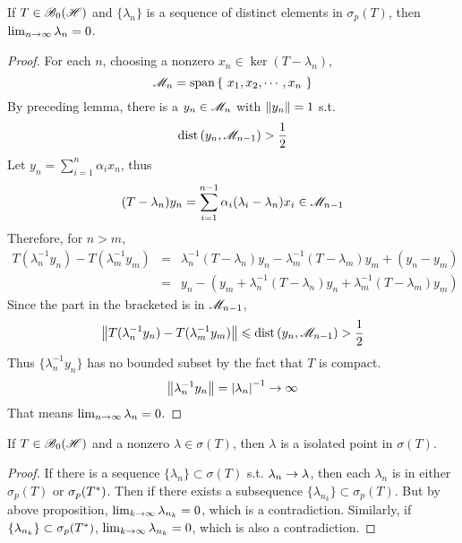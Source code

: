 \documentclass[a4paper,11pt]{report}
\begin{document}
\begin{prop}
	If $T \in \mathscr{B}_{0}\mathscr{(H)}$ and $\{\lambda_n\}$ is a sequence of distinct elements in $\sigma_p(T)$, then $\lim_{n \rightarrow \infty} \lambda_n = 0$.
\end{prop}
\begin{proof}
	For each $n$, choosing a nonzero $x_n \in \ker{(T-\lambda_n)}$,
	\begin{equation*}
		\mathscr{M}_n = \operatorname{span}{\{~x_1,x_2,\cdots,x_n~\}}
	\end{equation*}
	By preceding lemma, there is a $y_n \in \mathscr{M}_n$ with $\left\lVert y_n\right\lVert=1$ s.t.
	\begin{equation*}
		\operatorname{dist}{(y_n,\mathscr{M}_{n-1})} > \frac{1}{2}
	\end{equation*}
	Let $y_n = \sum_{i=1}^{n} \alpha_i x_n$, thus
	\begin{equation*}
		(T-\lambda_n)y_n = \sum_{i=1}^{n-1} \alpha_i (\lambda_i-\lambda_n)x_i \in \mathscr{M}_{n-1}
	\end{equation*}
	Therefore, for $n > m$,
	\begin{eqnarray*}
		T(\lambda_n^{-1}y_n)-T(\lambda_m^{-1}y_m) &=& \lambda_n^{-1}(T-\lambda_n)y_n - \lambda_m^{-1}(T-\lambda_m)y_m + (y_n - y_m) \\
		&=& y_n - (y_m + \lambda_n^{-1}(T-\lambda_n)y_n + \lambda_m^{-1}(T-\lambda_m)y_m)
	\end{eqnarray*}
	Since the part in the bracketed is in $\mathscr{M}_{n-1}$,
	\begin{equation*}
		\left\lVert T(\lambda_n^{-1}y_n)-T(\lambda_m^{-1}y_m)\right\lVert \leqslant \operatorname{dist}{(y_n,\mathscr{M}_{n-1})} > \frac{1}{2}
	\end{equation*}
	Thus $\{\lambda_n^{-1}y_n\}$ has no bounded subset by the fact that $T$ is compact.
	\begin{equation*}
		\left\lVert\lambda_n^{-1}y_n\right\lVert = \left\lvert\lambda_n\right\lvert^{-1} \rightarrow \infty
	\end{equation*}
	That means $\lim_{n \rightarrow \infty} \lambda_n = 0$.
\end{proof}

\begin{prop}
	If $T \in \mathscr{B}_{0}\mathscr{(H)}$ and a nonzero $\lambda \in \sigma(T)$, then $\lambda$ is a isolated point in $\sigma(T)$.
\end{prop}
\begin{proof}
	If there is a sequence $\{\lambda_n\} \subset \sigma(T)$ s.t. $\lambda_n \rightarrow \lambda$, then each $\lambda_n$ is in either $\sigma_p(T)$ or $\sigma_p(T^{*})$. Then if there exists a subsequence $\{\lambda_{n_k}\} \subset \sigma_p(T)$. But by above proposition, $\lim_{k \rightarrow \infty} \lambda_{n_k} =0$, which is a contradiction. Similarly, if $\{\lambda_{n_k}\} \subset \sigma_p(T^{*})$, $\lim_{k \rightarrow \infty} \lambda_{n_k} =0$, which is also a contradiction.
\end{proof}
\end{document}
